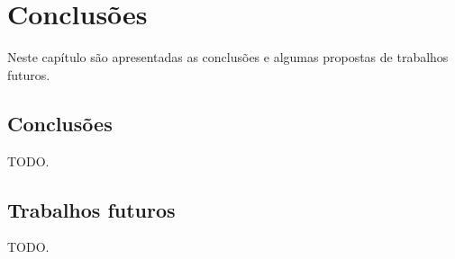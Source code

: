 \chapter{Conclusões \label{cap:conclusoes}}

\vfill{}

Neste capítulo são apresentadas as conclusões e algumas propostas de
trabalhos futuros.

\newpage

\section{Conclusões}

    TODO.

\section{Trabalhos futuros}

    TODO.
